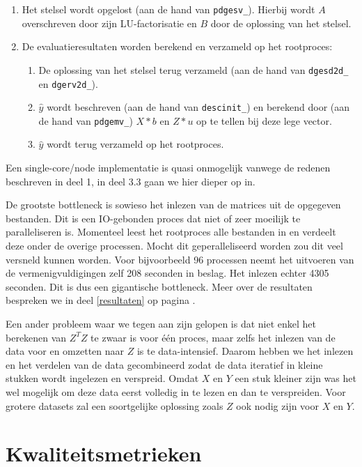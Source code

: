 \documentclass[a4paper,12pt]{report}
\begin{document}
\begin{enumerate}
\begin{enumerate}
		\end{enumerate}
	\item Het stelsel wordt opgelost (aan de hand van \texttt{pdgesv\_}). Hierbij wordt $A$ overschreven door zijn LU-factorisatie en $B$ door de oplossing van het stelsel.
	\item De evaluatieresultaten worden berekend en verzameld op het rootproces:
		\begin{enumerate}
			\item De oplossing van het stelsel terug verzameld (aan de hand van \texttt{dgesd2d\_} en \texttt{dgerv2d\_}).
			\item $\hat{y}$ wordt beschreven (aan de hand van \texttt{descinit\_}) en berekend door (aan de hand van \texttt{pdgemv\_}) $X*b$ en $Z*u$ op te tellen bij deze lege vector.
			\item $\hat{y}$ wordt terug verzameld op het rootproces.
		\end{enumerate}
\end{enumerate}

Een single-core/node implementatie is quasi onmogelijk vanwege de redenen beschreven in deel 1, in deel 3.3 gaan we hier dieper op in.

De grootste bottleneck is sowieso het inlezen van de matrices uit de opgegeven bestanden. Dit is een IO-gebonden proces dat niet of zeer moeilijk te paralleliseren is. Momenteel leest het rootproces alle bestanden in en verdeelt deze onder de overige processen. Mocht dit geperalleliseerd worden zou dit veel versneld kunnen worden. Voor bijvoorbeeld 96 processen neemt het uitvoeren van de vermenigvuldigingen zelf 208 seconden in beslag. Het inlezen echter 4305 seconden. Dit is dus een gigantische bottleneck. Meer over de resultaten bespreken we in deel \ref{resultaten} op pagina \pageref{resultaten}.

Een ander probleem waar we tegen aan zijn gelopen is dat niet enkel het berekenen van $Z^TZ$ te zwaar is voor \'e\'en proces, maar zelfs het inlezen van de data voor en omzetten naar $Z$ is te data-intensief. Daarom hebben we het inlezen en het verdelen van de data gecombineerd zodat de data iteratief in kleine stukken wordt ingelezen en verspreid. Omdat $X$ en $Y$ een stuk kleiner zijn was het wel mogelijk om deze data eerst volledig in te lezen en dan te verspreiden. Voor grotere datasets zal een soortgelijke oplossing zoals $Z$ ook nodig zijn voor $X$ en $Y$.

\section{Kwaliteitsmetrieken}
\end{document}
